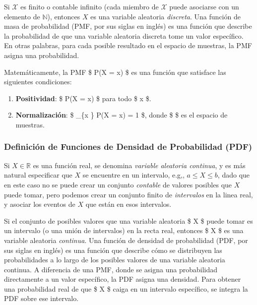 \documentclass[
  letterpaper,
  DIV=11,
  numbers=noendperiod]{scrartcl}
\providecommand{\tightlist}{%
  \setlength{\itemsep}{0pt}\setlength{\parskip}{0pt}}\usepackage{longtable,booktabs,array}
\begin{document}
Si \(\mathcal{X}\) es finito o contable infinito (cada miembro de
\(\mathcal{X}\) puede asociarse con un elemento de \(\mathbb{N}\)),
entonces \(X\) es una variable aleatoria \emph{discreta}. Una función de
masa de probabilidad (PMF, por sus siglas en inglés) es una función que
describe la probabilidad de que una variable aleatoria discreta tome un
valor específico. En otras palabras, para cada posible resultado en el
espacio de muestras, la PMF asigna una probabilidad.

Matemáticamente, la PMF \$ P(X = x) \$ es una función que satisface las
siguientes condiciones:

\begin{enumerate}
\def\labelenumi{\arabic{enumi}.}
\tightlist
\item
  \textbf{Positividad}: \$ P(X = x)  \$ para todo \$ x \$.
\item
  \textbf{Normalización}: \$ \sum\_\{x \in \Omega\} P(X = x) = 1 \$,
  donde \$ \Omega \$ es el espacio de muestras.
\end{enumerate}

\hypertarget{definiciuxf3n-de-funciones-de-densidad-de-probabilidad-pdf}{%
\subsubsection{Definición de Funciones de Densidad de Probabilidad
(PDF)}\label{definiciuxf3n-de-funciones-de-densidad-de-probabilidad-pdf}}

Si \(X\in \mathbb{R}\) es una función real, se denomina \emph{variable
aleatoria continua}, y es más natural especificar que \(X\) se encuentre
en un intervalo, e.g,, \(a \leq X \leq b\), dado que en este caso no se
puede crear un conjunto \emph{contable} de valores posibles que \(X\)
puede tomar, pero podemos crear un conjunto finito de \emph{intervalos}
en la linea real, y asociar los eventos de \(X\) que están en esos
intervalos.

Si el conjunto de posibles valores que una variable aleatoria \$ X \$
puede tomar es un intervalo (o una unión de intervalos) en la recta
real, entonces \$ X \$ es una variable aleatoria \emph{continua}. Una
función de densidad de probabilidad (PDF, por sus siglas en inglés) es
una función que describe cómo se distribuyen las probabilidades a lo
largo de los posibles valores de una variable aleatoria continua. A
diferencia de una PMF, donde se asigna una probabilidad directamente a
un valor específico, la PDF asigna una densidad. Para obtener una
probabilidad real de que \$ X \$ caiga en un intervalo específico, se
integra la PDF sobre ese intervalo.
\end{document}
